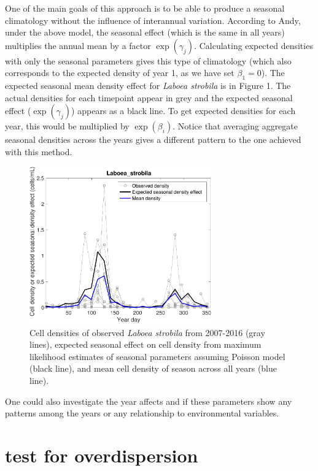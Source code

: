 \documentclass[11pt]{article}
\begin{document}
One of the main goals of this approach is to be able to produce a seasonal climatology without the influence of interannual variation. According to Andy, under the above model, the seasonal effect (which is the same in all years) multiplies the annual mean by a factor $\exp(\gamma_j)$. Calculating expected densities with only the seasonal parameters gives this type of climatology (which also corresponds to the expected density of year 1, as we have set $\beta_1=0$). The expected seasonal mean density effect for \textit{Laboea strobila} is in Figure 1. The actual densities for each timepoint appear in grey and the expected seasonal effect ($\exp(\gamma_j)$) appears as a black line. To get expected densities for each year, this would be multiplied by $\exp(\beta_i)$. Notice that averaging aggregate seasonal densities across the years gives a different pattern to the one achieved with this method.

\begin{figure}[h]
\centering
\includegraphics[width=0.7\textwidth]{Laboea_summary.pdf}
\caption{Cell densities of observed \textit{Laboea strobila} from 2007-2016 (gray lines), expected seasonal effect on cell density from maximum likelihood estimates of seasonal parameters assuming Poisson model (black line), and mean cell density of season across all years (blue line).}
\end{figure}

One could also investigate the year affects and if these parameters show any patterns among the years or any relationship to environmental variables. 
\clearpage

\section{test for overdispersion}        
\end{document}
